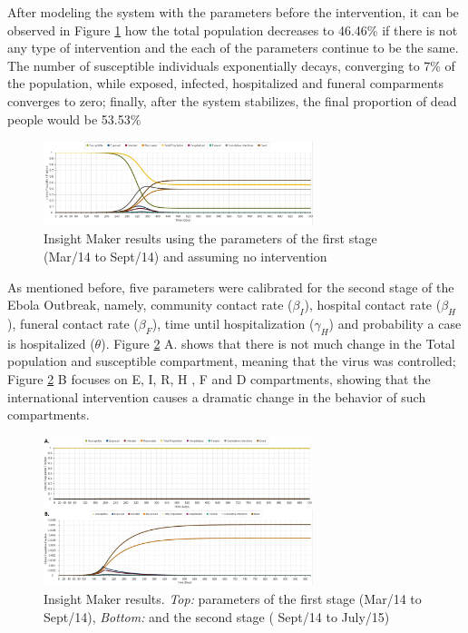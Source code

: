 %
\noindent After modeling the system with the parameters before the intervention, it can be observed in Figure \ref{fig:LB_IM_NoIn} how the total population decreases to 46.46\%  if there is not any type of intervention and the each of the parameters continue to be the same. The number of susceptible individuals exponentially decays, converging to 7\% of the population, while exposed, infected, hospitalized and funeral comparments converges to zero; finally, after the system stabilizes, the final proportion of dead people would be 53.53\% 

\begin{figure}[!h]
  \centering
  \includegraphics[width=0.7\textwidth]{LB_NoInt_SD_IM}
  \caption{ Insight Maker results using the parameters of the first stage (Mar/14 to Sept/14) and assuming no intervention}
\label{fig:LB_IM_NoIn} 
\end{figure}

\noindent As mentioned before, five parameters were calibrated for the second stage of the Ebola Outbreak, namely, community contact rate ($\beta_I$), hospital contact rate ($\beta_H$), funeral contact rate ($\beta_F$), time until hospitalization ($\gamma_H$) and probability a case is hospitalized ($\theta$). Figure \ref{fig:LB_IM_In} A. shows that there is not much change in the Total population and susceptible compartment, meaning that the virus was controlled;  Figure \ref{fig:LB_IM_In} B focuses on E, I, R, H , F and D compartments, showing that the international intervention causes a dramatic change in the behavior of such compartments.

\begin{figure}[!h]
  \centering
  \includegraphics[width=0.7\textwidth]{LB_Int3_SD_IM}
  \caption{ Insight Maker results. \textit{Top:} parameters of the first stage (Mar/14 to Sept/14), \textit{Bottom:} and the second stage ( Sept/14 to July/15)}
\label{fig:LB_IM_In} 
\end{figure}


